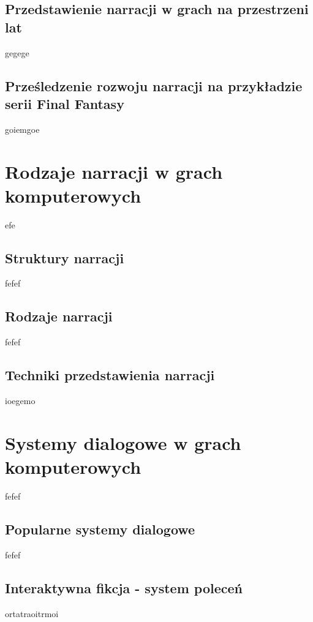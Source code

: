 \subsection{Przedstawienie narracji w grach na przestrzeni lat}\label{subsection:ch1_1_2}

gegege

\subsection{Prześledzenie rozwoju narracji na przykładzie serii Final Fantasy}\label{subsection:ch1_1_3}

goiemgoe

\section{Rodzaje narracji w grach komputerowych}\label{section:ch1_2}

efe

\subsection{Struktury narracji}\label{subsection:ch1_2_1}

fefef

\subsection{Rodzaje narracji}\label{subsection:ch1_2_2}

fefef

\subsection{Techniki przedstawienia narracji}\label{subsection:ch1_2_3}

ioegemo

\section{Systemy dialogowe w grach komputerowych}\label{section:ch1_3}

fefef

\subsection{Popularne systemy dialogowe}\label{subsection:ch1_3_1}

fefef

\subsection{Interaktywna fikcja - system poleceń}\label{subsection:ch1_3_2}

ortatraoitrmoi